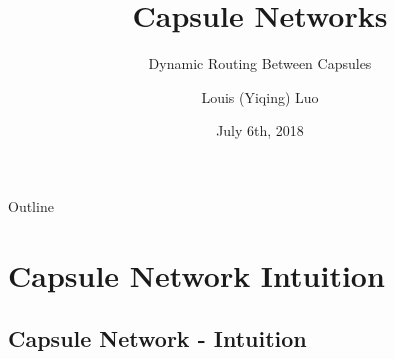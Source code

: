 \documentclass{beamer}
\title{Capsule Networks}
\subtitle{Dynamic Routing Between Capsules}
\author{Louis (Yiqing) Luo}
\institute[University of Toronto] %
\date{July 6th, 2018}
\begin{document}
\begin{frame}
  \titlepage
\end{frame}

\begin{frame}{Outline}
  \tableofcontents
\end{frame}

\section{Capsule Network Intuition}
\subsection{Capsule Network - Intuition}
\end{document}
